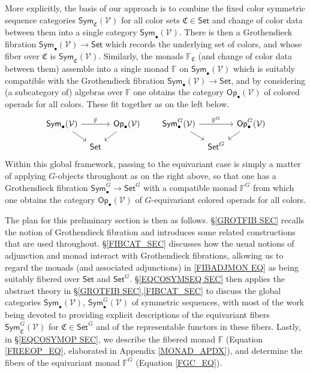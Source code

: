 \documentclass[a4paper,10pt
,draft
]{article}%
\numberwithin{equation}{section}
\numberwithin{figure}{section}
\theoremstyle{definition} %
\newcommand{\Sym}{\ensuremath{\mathsf{Sym}}}%
\newcommand{\Op}{\mathsf{Op}}%
\newcommand{\V}{\ensuremath{\mathcal V}}
\newcommand{\1}{\ensuremath{\mathbbm 1}}%
\begin{document}
More explicitly, the basis of our approach is to combine the 
fixed color symmetric sequence categories
$\mathsf{Sym}_{\mathfrak{C}}(\V)$ for all color sets 
$\mathfrak{C} \in \mathsf{Set}$
and change of color data between them into a single category
$\mathsf{Sym}_{\bullet}(\V)$.
There is then a Grothendieck fibration
$\mathsf{Sym}_{\bullet}(\V) \to \mathsf{Set}$
which records the underlying set of colors,
and whose fiber over $\mathfrak{C}$ is 
$\mathsf{Sym}_{\mathfrak{C}}(\V)$.
Similarly, the monads $\mathbb{F}_{\mathfrak{C}}$ (and change of color data between them) 
assemble into a single monad $\mathbb{F}$
on $\mathsf{Sym}_{\bullet}(\V)$
which is suitably compatible with 
the Grothendieck fibration 
$\mathsf{Sym}_{\bullet}(\V) \to \mathsf{Set}$,
and by considering (a subcategory of) algebras over $\mathbb{F}$
one obtains the category $\mathsf{Op}_{\bullet}(\V)$
of colored operads for all colors.
These fit together as on the left below.
\begin{equation}\label{FIBADJMON EQ}
\begin{tikzcd}[row sep = small, column sep = tiny]
\Sym_\bullet(\V) \arrow[rr, "\mathbb F"] \arrow[dr]
&&
\Op_\bullet(\V) \arrow[dl]
&&& %
\Sym^G_\bullet(\V) \arrow[rr, "\mathbb F^G"] \arrow[dr]
&&
\Op^G_\bullet(\V) \arrow[dl]
\\
&
\mathsf{Set}
&
&&& %
&
\mathsf{Set}^G
\end{tikzcd}
\end{equation}
Within this global framework, passing to the equivariant case is simply a matter of applying $G$-objects throughout as on the right above, 
so that one has a Grothendieck fibration
$\mathsf{Sym}_{\bullet}^G \to \mathsf{Set}^G$
with a compatible monad $\mathbb{F}^G$
from which one obtains the category 
$\mathsf{Op}_{\bullet}(\V)$
of $G$-equivariant colored operads for all colors. 


The plan for this preliminary section is then as follows.
%
\S \ref{GROTFIB SEC} recalls the notion of Grothendieck fibration and
introduces some related constructions that are used throughout.
%
\S \ref{FIBCAT_SEC} discusses how the usual notions of adjunction and monad interact with Grothendieck fibrations,
allowing us to regard the monads
(and associated adjunctions)
in \eqref{FIBADJMON EQ}
as being suitably fibered over $\mathsf{Set}$ and $\mathsf{Set}^G$.
%
\S \ref{EQCOSYMSEQ SEC} then applies the abstract theory in 
\S \ref{GROTFIB SEC},\ref{FIBCAT_SEC}
to discuss the global categories
$\mathsf{Sym}_{\bullet}(\V)$,
$\mathsf{Sym}^G_{\bullet}(\V)$
of symmetric sequences, 
with most of the work being devoted to providing 
explicit descriptions of the equivariant fibers
$\mathsf{Sym}^G_{\mathfrak{C}}(\V)$
for $\mathfrak{C} \in \mathsf{Set}^G$
and of the representable functors in these fibers.
%
Lastly, in \S \ref{EQCOSYMOP SEC}, 
we describe the fibered monad $\mathbb F$ (Equation \eqref{FREEOP_EQ}, elaborated in Appendix \ref{MONAD_APDX}),
and determine the fibers of the equivariant monad $\mathbb F^G$ (Equation \eqref{FGC_EQ}).
\end{document}
